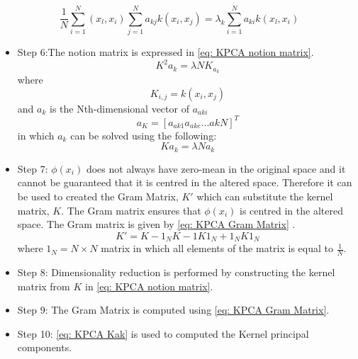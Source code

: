 \documentclass[11pt,twocolumn]{witseiepaper}
\begin{document}
	\begin{equation}
	\label{eq: KPCA multiplied}
	\frac{1}{N}\sum_{i=1}^{N}(x_l, x_i)\sum_{j=1}^{N}a_{kj}k(x_i, x_j) = \lambda_k\sum_{i=1}^{N}a_{ki}k(x_l, x_i)
	\end{equation}
	\begin{itemize}
		\item Step 6:The notion matrix is expressed in \eqref{eq: KPCA notion matrix}.
		\begin{equation}
			\label{eq: KPCA notion matrix}
			K^2a_k = \lambda N K_{a_k} 
		\end{equation}
		where 
		\begin{equation}
			K_{i,j} = k(x_i, x_j)
		\end{equation}
		and $a_k$ is the Nth-dimensional vector of $a_{aki}$
		\begin{equation}
			a_{K} = [a_{ak1}a_{ake} . . . akN]^T
		\end{equation}
		in which $a_k$ can be solved using the following:
		\begin{equation}
			\label{eq: KPCA Kak}
			Ka_k = \lambda N a_k
		\end{equation} 
		\item Step 7: $\phi(x_i)$ does not always have zero-mean in the original space and it cannot be guaranteed that it is centred in the altered space. Therefore it can be used to created the Gram Matrix, $K'$ which can substitute the kernel matrix, $K$. The Gram matrix ensures that $\phi(x_i)$ is centred in the altered space. The Gram matrix is given by \eqref{eq: KPCA Gram Matrix} \cite{Ibrahim_Baharudin2016} \cite{Scholkopf2012}.
		\begin{equation}
			\label{eq: KPCA Gram Matrix}
			K' = K - 1_N K - 1K1_N + 1_NK1_N
		\end{equation}
		where $1_N = N \times N$ matrix in which all elements of the matrix is equal to $\frac{1}{N}$.\\
		\item Step 8: Dimensionality reduction is performed by constructing the kernel matrix from $K$ in \eqref{eq: KPCA notion matrix}. \\
		\item Step 9: The Gram Matrix is computed using \eqref{eq: KPCA Gram Matrix}. \\
		\item Step 10: \eqref{eq: KPCA Kak} is used to computed the Kernel principal components.
	\end{itemize}
\end{document}

